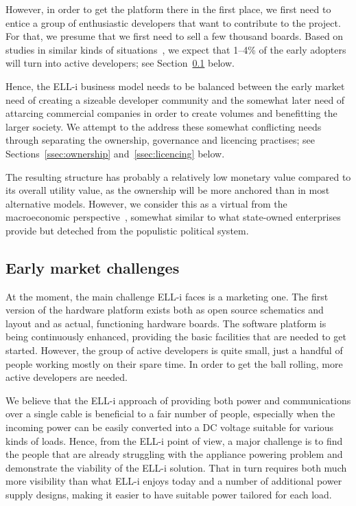\documentclass[final]{siamltex}
\begin{document}
However, in order to get the platform there in the first place, we
first need to entice a group of enthusiastic developers that want to
contribute to the project.  For that, we presume that we first need to
sell a few thousand boards.  Based on studies in similar kinds of
situations~\cite{need-reference}, we expect that 1--4\% of the early
adopters will turn into active developers; see
Section~\ref{ssec:earlymarket} below.

Hence, the ELL-i business model needs to be balanced between the early
market need of creating a sizeable developer community and the
somewhat later need of attarcing commercial companies in order to
create volumes and benefitting the larger society.  We attempt to the
address these somewhat conflicting needs through separating the
ownership, governance and licencing practises; see
Sections~\ref{ssec:ownership} and~\ref{ssec:licencing} below.

The resulting structure has probably a relatively low monetary value
compared to its overall utility value, as the ownership will be more
anchored than in most alternative models.  However, we consider this
as a virtual from the macroeconomic
perspective~\cite{Olson2002}, somewhat similar to what
state-owned enterprises provide but deteched from the populistic
political system.

\subsection{Early market challenges}
\label{ssec:earlymarket}

At the moment, the main challenge ELL-i faces is a marketing one.  The
first version of the hardware platform exists both as open source
schematics and layout and as actual, functioning hardware boards.  The
software platform is being continuously enhanced, providing the basic
facilities that are needed to get started.  However, the group of
active developers is quite small, just a handful of people working
mostly on their spare time.  In order to get the ball rolling, more
active developers are needed.

We believe that the ELL-i approach of providing both power and
communications over a single cable is beneficial to a fair number of
people, especially when the incoming power can be easily converted
into a DC voltage suitable for various kinds of loads.  Hence, from
the ELL-i point of view, a major challenge is to find the people that
are already struggling with the appliance powering problem and
demonstrate the viability of the ELL-i solution.  That in turn
requires both much more visibility than what ELL-i enjoys today and a
number of additional power supply designs, making it easier to have
suitable power tailored for each load.
\end{document}
